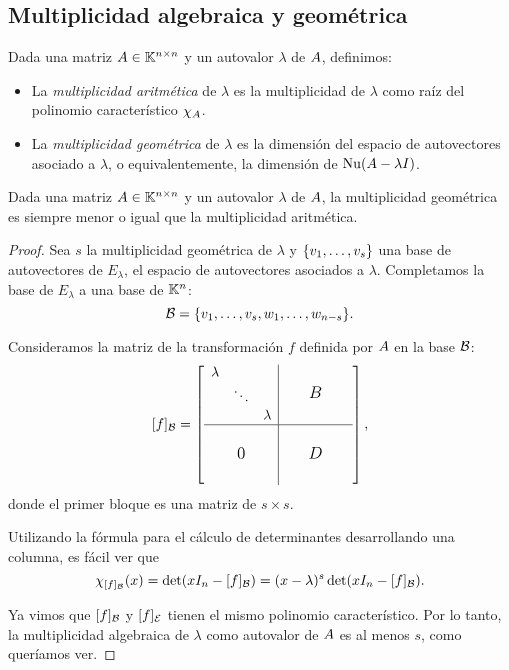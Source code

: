 \subsection{Multiplicidad algebraica y geométrica}
Dada una matriz $\Ab \in \Knn$ y un autovalor $\lambda$ de $\Ab$, definimos:
\begin{itemize}
\item La \emph{multiplicidad aritmética} de $\lambda$ es la multiplicidad de $\lambda$ como raíz del polinomio característico $\chi_{\Ab}$.
\item La \emph{multiplicidad geométrica} de $\lambda$ es la dimensión del espacio de autovectores asociado a $\lambda$, o equivalentemente, la dimensión de $\Nu(\Ab - \lambda \Ib)$.
\end{itemize}

\begin{prop}
Dada una matriz $\Ab \in  \Knn$ y un autovalor $\lambda$ de $\Ab$, la multiplicidad geométrica es siempre menor o igual que la multiplicidad aritmética.
\end{prop}

\begin{proof} Sea $s$ la multiplicidad geométrica de $\lambda$ y $\{\vb_1, \dots, \vb_s\}$ una base de autovectores de $E_{\lambda}$, el espacio de autovectores asociados a $\lambda$. Completamos la base de $E_{\lambda}$ a una base de $\mathbb K^{n}$:
$$
\B = \{\vb_1, \dots, \vb_s, \wb_1, \dots, \wb_{n-s}\}.
$$

Consideramos la matriz de la transformación $f$ definida por $\Ab$ en la base $\mathcal B$:
$$
\sbox0{$\begin{matrix}\lambda & & \\ & \ddots & \\ & & \lambda\end{matrix}$}
[f]_\B =\left[
\begin{array}{c|c}
\usebox{0}&\makebox[\wd0]{\large $B$}\\
\hline
  \vphantom{\usebox{0}}\makebox[\wd0]{\large $0$}&\makebox[\wd0]{\large $D$}
\end{array}
\right],
$$
donde el primer bloque es una matriz de $s \times s$.

Utilizando la fórmula para el cálculo de determinantes desarrollando una columna, es fácil ver que
$$
\chi_{[f]_\B}(x) = \det(x\Ib_n - [f]_\B) = (x-\lambda)^s \det (x\Ib_n - [f]_\B).$$

 Ya vimos que $[f]_\mathcal B$ y $[f]_\mathcal E$ tienen el mismo polinomio característico. Por lo tanto, la multiplicidad algebraica de $\lambda$ como autovalor de $\Ab$ es al menos $s$, como queríamos ver.
\end{proof}

